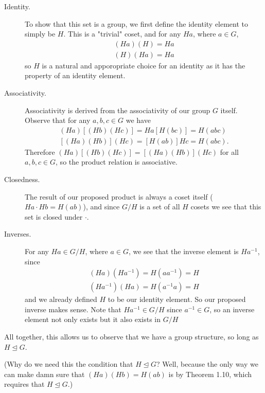 \documentclass[12pt,letterpaper]{algebra_book}
\newcommand{\normal}{\unlhd}
\theoremstyle{definition}
\begin{document}
    \begin{prf}
        \begin{description}
            \item[Identity.] To show that this set is a group, we first define the identity
            element to simply be $H$. This is a "trivial" coset, and for
            any $Ha$, where $a \in G$, 
            \begin{align*}
                (Ha)(H) = Ha \\
                (H)(Ha) = Ha
            \end{align*}
            so $H$ is a natural and apporopriate choice for an identity as
           it has the property of an identity element.  

           \item[Associativity.] Associativity is derived from the
           associativity of our group $G$ itself. Observe that for any
           $a, b, c \in G$ we have 
           \begin{align*}
               (Ha)[ (Hb)(Hc)] = Ha[H(bc)] = H(abc)\\
               [(Ha)(Hb)](Hc) = [H(ab)]Hc = H(abc).
           \end{align*}
           Therefore $(Ha)[ (Hb)(Hc)] = [(Ha)(Hb)](Hc)$ for all $a, b,
           c \in G$, so the product relation is associative.

           \item[Closedness.] The result of our proposed product is
           always a coset itself ($Ha \cdot Hb = H(ab)$), and since 
           $G/H$ is a set of all $H$ cosets we see that this set is
           closed under $\cdot$.

           \item[Inverses.] For any $Ha \in G/H$, where $a \in G$, we
           see that the inverse element is $Ha^{-1}$, since 
           \begin{align*}
               (Ha)(Ha^{-1}) = H(aa^{-1}) = H\\
               (Ha^{-1})(Ha) = H(a^{-1}a) = H
           \end{align*}
           and we already defined $H$ to be our identity element. So
           our proposed inverse makes sense.
           Note that
           $Ha^{-1} \in G/H$ since $a^{-1} \in G$, so an inverse
           element not only exists but it also exists in $G/H$
        \end{description}
        All together, this allows us to observe that we have a group
        structure, so long as $H \normal G$.
    \end{prf}
    {\color{purple}(Why do we need this
        the condition that $H \normal G$? Well, because the only way we can make damn sure
        that $(Ha)(Hb) = H(ab)$ is by Theorem 1.10, which requires
        that $H \normal G$.)
        }
\end{document}
